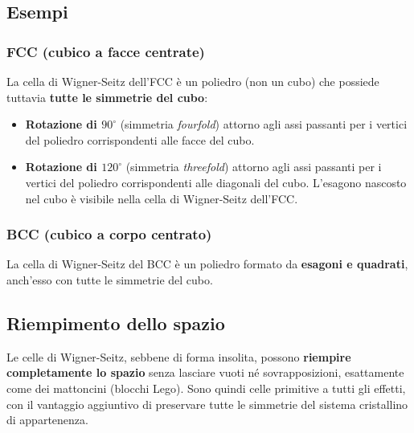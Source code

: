 \subsection*{Esempi}

\subsubsection{FCC (cubico a facce centrate)}
La cella di Wigner-Seitz dell'FCC è un poliedro (non un cubo) che possiede tuttavia \textbf{tutte le simmetrie del cubo}:
\begin{itemize}
    \item \textbf{Rotazione di $90^\circ$} (simmetria \textit{fourfold}) attorno agli assi passanti per i vertici del poliedro corrispondenti alle facce del cubo.
    \item \textbf{Rotazione di $120^\circ$} (simmetria \textit{threefold}) attorno agli assi passanti per i vertici del poliedro corrispondenti alle diagonali del cubo. L'esagono nascosto nel cubo è visibile nella cella di Wigner-Seitz dell'FCC.
\end{itemize}

\subsubsection{BCC (cubico a corpo centrato)}
La cella di Wigner-Seitz del BCC è un poliedro formato da \textbf{esagoni e quadrati}, anch'esso con tutte le simmetrie del cubo.

\subsection*{Riempimento dello spazio}
Le celle di Wigner-Seitz, sebbene di forma insolita, possono \textbf{riempire completamente lo spazio} senza lasciare vuoti né sovrapposizioni, esattamente come dei mattoncini (blocchi Lego). Sono quindi celle primitive a tutti gli effetti, con il vantaggio aggiuntivo di preservare tutte le simmetrie del sistema cristallino di appartenenza.

